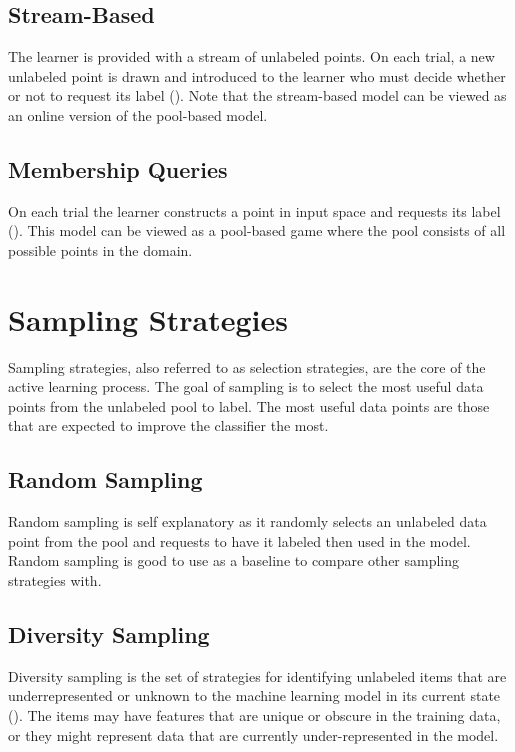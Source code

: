 \subsection{Stream-Based}
The learner is provided with a stream of unlabeled points. On each trial, a new unlabeled point is drawn and introduced to the learner who must decide whether or not to request its label (\cite{baram2004online}). Note that the stream-based model can be viewed as an online version of the pool-based model. 

\subsection{Membership Queries}
On each trial the learner constructs a point in input space and requests its label (\cite{baram2004online}). This model can be viewed as a pool-based game where the pool consists of all possible points in the domain.

\section{Sampling Strategies}

Sampling strategies, also referred to as selection strategies, are the core of the active learning process. The goal of sampling is to select the most useful data points from the unlabeled pool to label. The most useful data points are those that are expected to improve the classifier the most.

\subsection{Random Sampling}
Random sampling is self explanatory as it randomly selects an unlabeled data point from the pool and requests to have it labeled then used in the model. Random sampling is good to use as a baseline to compare other sampling strategies with.

\subsection{Diversity Sampling}
Diversity sampling is the set of strategies for identifying unlabeled items that are underrepresented or unknown to the machine learning model in its current state (\cite{munro2021human}). The items may have features that are unique or obscure in the training data, or they might represent data that are currently under-represented in the model. 

